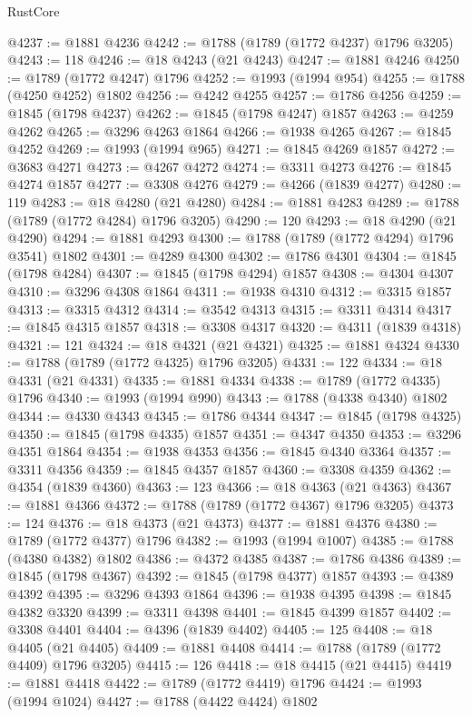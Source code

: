 \begin{lexlean}{RustCore}
\begin{coremodule}
@4237 := @1881 @4236
@4242 := @1788 (@1789 (@1772 @4237) @1796 @3205)
@4243 := 118
@4246 := @18 @4243 (@21 @4243)
@4247 := @1881 @4246
@4250 := @1789 (@1772 @4247) @1796
@4252 := @1993 (@1994 @954)
@4255 := @1788 (@4250 @4252) @1802
@4256 := @4242 @4255
@4257 := @1786 @4256
@4259 := @1845 (@1798 @4237)
@4262 := @1845 (@1798 @4247) @1857
@4263 := @4259 @4262
@4265 := @3296 @4263 @1864
@4266 := @1938 @4265
@4267 := @1845 @4252
@4269 := @1993 (@1994 @965)
@4271 := @1845 @4269 @1857
@4272 := @3683 @4271
@4273 := @4267 @4272
@4274 := @3311 @4273
@4276 := @1845 @4274 @1857
@4277 := @3308 @4276
@4279 := @4266 (@1839 @4277)
@4280 := 119
@4283 := @18 @4280 (@21 @4280)
@4284 := @1881 @4283
@4289 := @1788 (@1789 (@1772 @4284) @1796 @3205)
@4290 := 120
@4293 := @18 @4290 (@21 @4290)
@4294 := @1881 @4293
@4300 := @1788 (@1789 (@1772 @4294) @1796 @3541) @1802
@4301 := @4289 @4300
@4302 := @1786 @4301
@4304 := @1845 (@1798 @4284)
@4307 := @1845 (@1798 @4294) @1857
@4308 := @4304 @4307
@4310 := @3296 @4308 @1864
@4311 := @1938 @4310
@4312 := @3315 @1857
@4313 := @3315 @4312
@4314 := @3542 @4313
@4315 := @3311 @4314
@4317 := @1845 @4315 @1857
@4318 := @3308 @4317
@4320 := @4311 (@1839 @4318)
@4321 := 121
@4324 := @18 @4321 (@21 @4321)
@4325 := @1881 @4324
@4330 := @1788 (@1789 (@1772 @4325) @1796 @3205)
@4331 := 122
@4334 := @18 @4331 (@21 @4331)
@4335 := @1881 @4334
@4338 := @1789 (@1772 @4335) @1796
@4340 := @1993 (@1994 @990)
@4343 := @1788 (@4338 @4340) @1802
@4344 := @4330 @4343
@4345 := @1786 @4344
@4347 := @1845 (@1798 @4325)
@4350 := @1845 (@1798 @4335) @1857
@4351 := @4347 @4350
@4353 := @3296 @4351 @1864
@4354 := @1938 @4353
@4356 := @1845 @4340 @3364
@4357 := @3311 @4356
@4359 := @1845 @4357 @1857
@4360 := @3308 @4359
@4362 := @4354 (@1839 @4360)
@4363 := 123
@4366 := @18 @4363 (@21 @4363)
@4367 := @1881 @4366
@4372 := @1788 (@1789 (@1772 @4367) @1796 @3205)
@4373 := 124
@4376 := @18 @4373 (@21 @4373)
@4377 := @1881 @4376
@4380 := @1789 (@1772 @4377) @1796
@4382 := @1993 (@1994 @1007)
@4385 := @1788 (@4380 @4382) @1802
@4386 := @4372 @4385
@4387 := @1786 @4386
@4389 := @1845 (@1798 @4367)
@4392 := @1845 (@1798 @4377) @1857
@4393 := @4389 @4392
@4395 := @3296 @4393 @1864
@4396 := @1938 @4395
@4398 := @1845 @4382 @3320
@4399 := @3311 @4398
@4401 := @1845 @4399 @1857
@4402 := @3308 @4401
@4404 := @4396 (@1839 @4402)
@4405 := 125
@4408 := @18 @4405 (@21 @4405)
@4409 := @1881 @4408
@4414 := @1788 (@1789 (@1772 @4409) @1796 @3205)
@4415 := 126
@4418 := @18 @4415 (@21 @4415)
@4419 := @1881 @4418
@4422 := @1789 (@1772 @4419) @1796
@4424 := @1993 (@1994 @1024)
@4427 := @1788 (@4422 @4424) @1802

\end{coremodule}
\end{lexlean}
